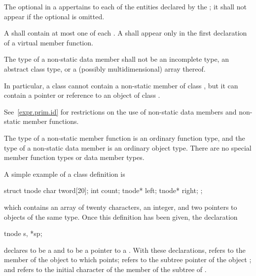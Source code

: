\pnum
The optional  in a 
appertains to each of the entities declared by the ;
it shall not appear if the optional  is omitted.

\pnum
A  shall contain at most one of each
.
A 
shall appear only in the first declaration of a virtual member
function.

\pnum
{}%
The type of a non-static data member shall not be an
incomplete type,
an abstract class type,
or a (possibly multidimensional) array thereof.
\begin{note}
In particular, a class  cannot contain
a non-static member of class ,
but it can contain a pointer or reference to an object of class .
\end{note}

\pnum
\begin{note}
See~\ref{expr.prim.id} for restrictions on the use of non-static data
members and non-static member functions.
\end{note}

\pnum
\begin{note}
The type of a non-static member function is an ordinary function type,
and the type of a non-static data member is an ordinary object type.
There are no special member function types or data member types.
\end{note}

\pnum
\begin{example}
A simple example of a class definition is
\begin{codeblock}
struct tnode {
  char tword[20];
  int count;
  tnode* left;
  tnode* right;
};
\end{codeblock}
which contains an array of twenty characters, an integer, and two
pointers to objects of the same type. Once this definition has been
given, the declaration
\begin{codeblock}
tnode s, *sp;
\end{codeblock}
declares  to be a  and  to be a pointer
to a . With these declarations,  refers to
the  member of the object to which  points;
 refers to the  subtree pointer of the object
; and  refers to the initial character
of the  member of the  subtree of .
\end{example}

